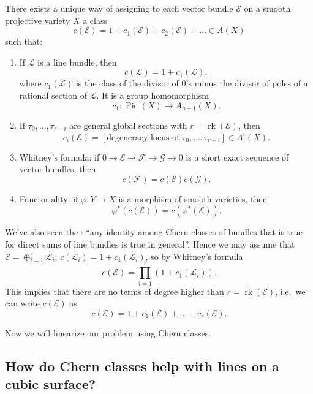 \documentclass[12pt,a4paper]{amsart}
\theoremstyle{plain}
\theoremstyle{definition}
\theoremstyle{remark}
\begin{document}
There exists a unique way of assigning to each vector bundle $\mathscr{E}$ on a smooth projective variety $X$ a class
\[ c(\mathscr{E}) = 1 + c_{1}(\mathscr{E}) + c_{2}(\mathscr{E}) + \ldots \in A(X) \]
such that:
\begin{enumerate}[label=\arabic*)]
  \item If $\mathscr{L}$ is a line bundle, then
    \[ c(\mathscr{L}) = 1 + c_{1}(\mathscr{L}), \]
    where $c_{1}(\mathscr{L})$ is the class of the divisor of $0$'s minus the divisor of poles of a rational section of $\mathscr{L}$.
    It is a group homomorphism
    \[ c_{1} \colon \operatorname{Pic}(X) \to A_{n-1}(X). \]
  \item If $\tau_{0}, \ldots, \tau_{r-i}$ are general global sections with $r = \operatorname{rk}(\mathscr{E})$, then
    \[ c_{i}(\mathscr{E}) = [ \text{degeneracy locus of } \tau_{0}, \ldots, \tau_{r-i} ] \in A^{i}(X). \]
  \item Whitney's formula: if $0 \to \mathscr{E} \to \mathscr{F} \to \mathscr{G} \to 0$ is a short exact sequence of vector bundles, then
    \[ c(\mathscr{F}) = c(\mathscr{E})c(\mathscr{G}). \]
  \item Functoriality: if $\varphi \colon Y \to X$ is a morphism of smooth varieties, then
    \[ \varphi^{*}(c(\mathscr{E})) = c(\varphi^{*}(\mathscr{E})). \]
\end{enumerate}

We've also seen the \underline{}: ``any identity among Chern classes of bundles that is true for direct sums of line bundles is true in general''.
Hence we may assume that $\mathscr{E} = \oplus_{i=1}^{r} \mathscr{L}_{i}$; $c(\mathscr{L}_{i}) = 1 + c_{1}(\mathscr{L}_{i})$, so by Whitney's formula
\[ c(\mathscr{E}) = \prod_{i=1}^{r} (1 + c_{1}(\mathscr{L}_{i})). \]
This implies that there are no terms of degree higher than $r = \operatorname{rk}(\mathscr{E})$, i.e.~we can write $c(\mathscr{E})$ as
\[ c(\mathscr{E}) = 1 + c_{1}(\mathscr{E}) + \ldots + c_{r}(\mathscr{E}). \]

Now we will linearize our problem using Chern classes.

\subsection{How do Chern classes help with lines on a cubic surface?}
\end{document}
